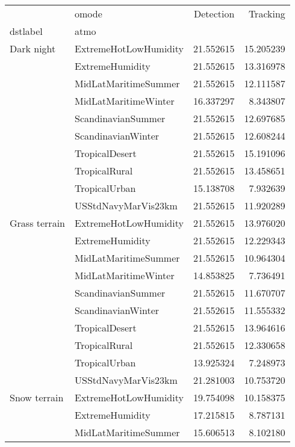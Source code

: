 \begin{tabular}{llrr}
\toprule
             & omode &  Detection &   Tracking \\
dstlabel & atmo &            &            \\
\midrule
Dark night & ExtremeHotLowHumidity &  21.552615 &  15.205239 \\
             & ExtremeHumidity &  21.552615 &  13.316978 \\
             & MidLatMaritimeSummer &  21.552615 &  12.111587 \\
             & MidLatMaritimeWinter &  16.337297 &   8.343807 \\
             & ScandinavianSummer &  21.552615 &  12.697685 \\
             & ScandinavianWinter &  21.552615 &  12.608244 \\
             & TropicalDesert &  21.552615 &  15.191096 \\
             & TropicalRural &  21.552615 &  13.458651 \\
             & TropicalUrban &  15.138708 &   7.932639 \\
             & USStdNavyMarVis23km &  21.552615 &  11.920289 \\
Grass terrain & ExtremeHotLowHumidity &  21.552615 &  13.976020 \\
             & ExtremeHumidity &  21.552615 &  12.229343 \\
             & MidLatMaritimeSummer &  21.552615 &  10.964304 \\
             & MidLatMaritimeWinter &  14.853825 &   7.736491 \\
             & ScandinavianSummer &  21.552615 &  11.670707 \\
             & ScandinavianWinter &  21.552615 &  11.555332 \\
             & TropicalDesert &  21.552615 &  13.964616 \\
             & TropicalRural &  21.552615 &  12.330658 \\
             & TropicalUrban &  13.925324 &   7.248973 \\
             & USStdNavyMarVis23km &  21.281003 &  10.753720 \\
Snow terrain & ExtremeHotLowHumidity &  19.754098 &  10.158375 \\
             & ExtremeHumidity &  17.215815 &   8.787131 \\
             & MidLatMaritimeSummer &  15.606513 &   8.102180 \\

\end{tabular}
